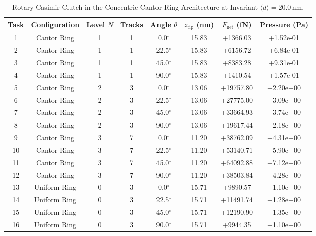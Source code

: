 \begin{table}[t]
\centering
\caption{Rotary Casimir Clutch in the Concentric Cantor-Ring Architecture at Invariant $\langle d \rangle = 20.0\,\text{nm}$.}
\label{tab:concentric_ring_clutch}
\begin{tabular}{cccccccc}
\hline\hline
Task & Configuration & Level $N$ & Tracks & Angle $\theta$ & $z_{\text{tip}}$ (nm) & $F_{\text{net}}$ (fN) & Pressure (Pa) \\
\hline
1 & Cantor Ring & 1 & 1 & 0.0$^\circ$ & 15.83 & +1366.03 & +1.52e-01 \\
2 & Cantor Ring & 1 & 1 & 22.5$^\circ$ & 15.83 & +6156.72 & +6.84e-01 \\
3 & Cantor Ring & 1 & 1 & 45.0$^\circ$ & 15.83 & +8383.28 & +9.31e-01 \\
4 & Cantor Ring & 1 & 1 & 90.0$^\circ$ & 15.83 & +1410.54 & +1.57e-01 \\
5 & Cantor Ring & 2 & 3 & 0.0$^\circ$ & 13.06 & +19757.80 & +2.20e+00 \\
6 & Cantor Ring & 2 & 3 & 22.5$^\circ$ & 13.06 & +27775.00 & +3.09e+00 \\
7 & Cantor Ring & 2 & 3 & 45.0$^\circ$ & 13.06 & +33664.93 & +3.74e+00 \\
8 & Cantor Ring & 2 & 3 & 90.0$^\circ$ & 13.06 & +19617.44 & +2.18e+00 \\
9 & Cantor Ring & 3 & 7 & 0.0$^\circ$ & 11.20 & +38762.09 & +4.31e+00 \\
10 & Cantor Ring & 3 & 7 & 22.5$^\circ$ & 11.20 & +53140.71 & +5.90e+00 \\
11 & Cantor Ring & 3 & 7 & 45.0$^\circ$ & 11.20 & +64092.88 & +7.12e+00 \\
12 & Cantor Ring & 3 & 7 & 90.0$^\circ$ & 11.20 & +38503.84 & +4.28e+00 \\
13 & Uniform Ring & 0 & 3 & 0.0$^\circ$ & 15.71 & +9890.57 & +1.10e+00 \\
14 & Uniform Ring & 0 & 3 & 22.5$^\circ$ & 15.71 & +11491.74 & +1.28e+00 \\
15 & Uniform Ring & 0 & 3 & 45.0$^\circ$ & 15.71 & +12190.90 & +1.35e+00 \\
16 & Uniform Ring & 0 & 3 & 90.0$^\circ$ & 15.71 & +9944.35 & +1.10e+00 \\
\hline\hline
\end{tabular}
\end{table}
